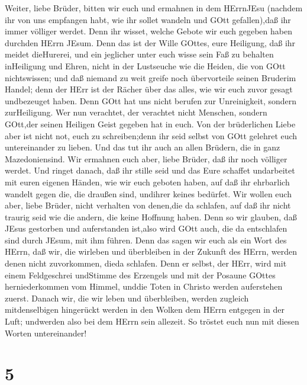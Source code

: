  Weiter, liebe Brüder, bitten wir euch und ermahnen in dem
HErrnJEsu (nachdem ihr von uns empfangen habt, wie ihr sollet wandeln
und GOtt gefallen),daß ihr immer völliger werdet.  Denn ihr
wisset, welche Gebote wir euch gegeben haben durchden HErrn JEsum.
 Denn das ist der Wille GOttes, eure Heiligung, daß ihr
meidet dieHurerei,  und ein jeglicher unter euch wisse sein
Faß zu behalten inHeiligung und Ehren,  nicht in der
Lustseuche wie die Heiden, die von GOtt nichtswissen;  und
daß niemand zu weit greife noch übervorteile seinen Bruderim Handel;
denn der HErr ist der Rächer über das alles, wie wir euch zuvor gesagt
undbezeuget haben.  Denn GOtt hat uns nicht berufen zur
Unreinigkeit, sondern zurHeiligung.  Wer nun verachtet, der
verachtet nicht Menschen, sondern GOtt,der seinen Heiligen Geist gegeben
hat in euch.  Von der brüderlichen Liebe aber ist nicht not,
euch zu schreiben;denn ihr seid selbst von GOtt gelehret euch
untereinander zu lieben.  Und das tut ihr auch an allen
Brüdern, die in ganz Mazedoniensind. Wir ermahnen euch aber, liebe
Brüder, daß ihr noch völliger werdet.  Und ringet danach,
daß ihr stille seid und das Eure schaffet undarbeitet mit euren eigenen
Händen, wie wir euch geboten haben,  auf daß ihr ehrbarlich
wandelt gegen die, die draußen sind, undihrer keines bedürfet.
 Wir wollen euch aber, liebe Brüder, nicht verhalten von
denen,die da schlafen, auf daß ihr nicht traurig seid wie die andern,
die keine Hoffnung haben.  Denn so wir glauben, daß JEsus
gestorben und auferstanden ist,also wird GOtt auch, die da entschlafen
sind durch JEsum, mit ihm führen.  Denn das sagen wir euch
als ein Wort des HErrn, daß wir, die wirleben und überbleiben in der
Zukunft des HErrn, werden denen nicht zuvorkommen, dieda schlafen.
 Denn er selbst, der HErr, wird mit einem Feldgeschrei
undStimme des Erzengels und mit der Posaune GOttes herniederkommen vom
Himmel, unddie Toten in Christo werden auferstehen zuerst. 
Danach wir, die wir leben und überbleiben, werden zugleich
mitdenselbigen hingerückt werden in den Wolken dem HErrn entgegen in der
Luft; undwerden also bei dem HErrn sein allezeit.  So
tröstet euch nun mit diesen Worten untereinander!

\hypertarget{section-4}{%
\section{5}\label{section-4}}

